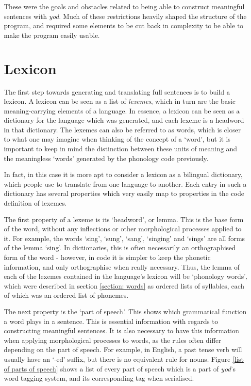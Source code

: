 \documentclass{report}
\begin{document}
	These were the goals and obstacles related to being able to construct meaningful sentences with \textit{yod}. Much of these restrictions heavily shaped the structure of the program, and required some elements to be cut back in complexity to be able to make the program easily usable.
	
	\section{Lexicon}
	\label{section: lexicon}
	
	The first step towards generating and translating full sentences is to build a lexicon. A lexicon can be seen as a list of \textit{lexemes}, which in turn are the basic meaning-carrying elements of a language. In essence, a lexicon can be seen as a dictionary for the language which was generated, and each lexeme is a headword in that dictionary. The lexemes can also be referred to as words, which is closer to what one may imagine when thinking of the concept of a `word', but it is important to keep in mind the distinction between these units of meaning and the meaningless `words' generated by the phonology code previously. 
	
	In fact, in this case it is more apt to consider a lexicon as a bilingual dictionary, which people use to translate from one language to another. Each entry in such a dictionary has several properties which very easily map to properties in the code definition of lexemes.
	
	The first property of a lexeme is its `headword', or lemma. This is the base form of the word, without any inflections or other morphological processes applied to it. For example, the words `sing', `sung', `sang', `singing' and `sings' are all forms of the lemma `sing'. In dictionaries, this is often necessarily an orthographised form of the word - however, in code it is simpler to keep the phonetic information, and only orthographise when really necessary. Thus, the lemma of each of the lexemes contained in the language's lexicon will be `phonology words', which were described in section \ref{section: words} as ordered lists of syllables, each of which was an ordered list of phonemes.
	
	The next property is the `part of speech'. This shows which grammatical function a word plays in a sentence. This is essential information with regards to constructing meaningful sentences. It is also necessary to have this information when applying morphological processes to words, as the rules often differ depending on the part of speech. For example, in English, a past tense verb will usually have an `-ed' suffix, but there is no equivalent rule for nouns. Figure \ref{list of parts of speech} shows a list of every part of speech which is a part of \textit{yod}'s word tagging system, and its corresponding tag when serialised.
	
\end{document}
